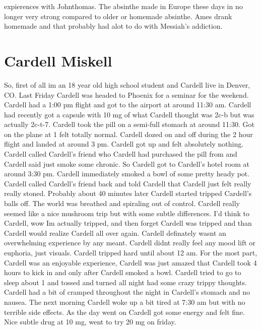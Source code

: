 \documentclass[12pt]{book}
\begin{document}
expierences with Johnthomas. The absinthe made in Europe these days in no longer very strong compared to older or homemade absinthe. Ames drank homemade and that probably had alot to do with Messiah's addiction.



\chapter{Cardell Miskell}

So, first of all im an 18 year old high school student and Cardell live in Denver, CO. Last Friday Cardell was headed to Phoenix for a seminar for the weekend. Cardell had a 1:00 pm flight and got to the airport at around 11:30 am. Cardell had recently got a capsule with 10 mg of what Cardell thought was 2c-b but was actually 2c-t-7. Cardell took the pill on a semi-full stomach at around 11:30. Got on the plane at 1 felt totally normal. Cardell dozed on and off during the 2 hour flight and landed at around 3 pm. Cardell got up and felt absolutely nothing. Cardell called Cardell's friend who Cardell had purchased the pill from and Cardell said just smoke some chronic. So Cardell got to Cardell's hotel room at around 3:30 pm. Cardell immediately smoked a bowl of some pretty heady pot. Cardell called Cardell's friend back and told Cardell that Cardell just felt really really stoned. Probably about 40 minutes later Cardell started tripped Cardell's balls off. The world was breathed and spiraling out of control. Cardell really seemed like a nice mushroom trip but with some subtle differences. I'd think to Cardell, wow Im actually tripped, and then forget Cardell was tripped and than Cardell would realize Cardell all over again. Cardell definately wasnt an overwhelming experience by any meant. Cardell didnt really feel any mood lift or euphoria, just visuals. Cardell tripped hard until about 12 am. For the most part, Cardell was an enjoyable experience, Cardell was just amazed that Cardell took 4 hours to kick in and only after Cardell smoked a bowl. Cardell tried to go to sleep about 1 and tossed and turned all night had some crazy trippy thoughts. Cardell had a bit of cramped throughout the night in Cardell's stomach and no nausea. The next morning Cardell woke up a bit tired at 7:30 am but with no terrible side effects. As the day went on Cardell got some energy and felt fine. Nice subtle drug at 10 mg, went to try 20 mg on friday.
\end{document}
